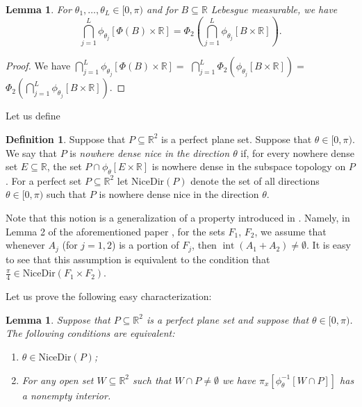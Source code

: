 \documentclass[12pt]{amsart}
\theoremstyle{plain}
\newtheorem{lemma}[theorem]{Lemma}
\theoremstyle{definition}
\newtheorem{definition}[theorem]{Definition}
\theoremstyle{remark}
\newcommand{\real}{\mathbb{R}}
\newcommand{\NICEDIRECTIONS}{\mathrm{NiceDir}}
\begin{document}
\begin{lemma}\label{lemma:finite-rotations-density-points}
  For $\theta_1,\ldots,\theta_L \in [0, \pi)$
  and for $B\subseteq\real$ Lebesgue measurable,
  we have
  \[
    \bigcap_{j=1}^L \phi_{\theta_j} [\Phi(B) \times \real] =
    \Phi_2(\bigcap_{j=1}^L \phi_{\theta_j} [B\times\real]).
  \]
\end{lemma}
\begin{proof}
  We have
  $\bigcap_{j=1}^L \phi_{\theta_j} [\Phi(B) \times \real] =$
  $\bigcap_{j=1}^L \Phi_2(\phi_{\theta_j} [B\times\real]) =$
  $\Phi_2(\bigcap_{j=1}^L \phi_{\theta_j} [B\times\real])$.
\end{proof}

Let us define
\begin{definition}
  Suppose that $P \subseteq \real^2$ is a perfect plane set.
  Suppose that $\theta \in [0, \pi)$. We say that
  $P$ is {\it nowhere dense nice in the direction $\theta$}
  if, for every nowhere dense set $E \subseteq \real$, the set
  $P \cap \phi_{\theta}[E \times \real]$ is
  nowhere dense in the subspace topology on $P$.
  For a perfect set $P \subseteq \real^2$
  let $\NICEDIRECTIONS(P)$ denote the set of all directions $\theta \in [0, \pi)$
  such that $P$ is nowhere dense nice in the direction $\theta$.
\end{definition}

Note that this notion is a generalization of a property introduced in
\cite{Laczkovich1998}. Namely, in Lemma 2 of the aforementioned paper \cite{Laczkovich1998},
for the sets $F_1$, $F_2$, we assume that whenever $A_j$ (for $j = 1,2$) is a portion
of $F_j$, then $\operatorname{int}(A_1 + A_2) \not= \emptyset$.
It is easy to see that this assumption is equivalent to the
condition that $\frac{\pi}{4} \in \NICEDIRECTIONS(F_1 \times F_2)$.

Let us prove the following easy characterization:
\begin{lemma}
Suppose that $P \subseteq \real^2$ is a perfect plane set and
suppose that $\theta \in [0, \pi)$. The following conditions are
equivalent:

\begin{enumerate}
\item\label{enumerate:nicedir}
  $\theta \in \NICEDIRECTIONS(P)$;
\item\label{enumerate:nicedir-characterization}
  For any open set $W \subseteq \real^2$ such that
  $W \cap P \not= \emptyset$ we have
  $\pi_x[\phi_{\theta}^{-1}[W \cap P]]$ has a nonempty interior.
\end{enumerate}

\end{lemma}
\end{document}
